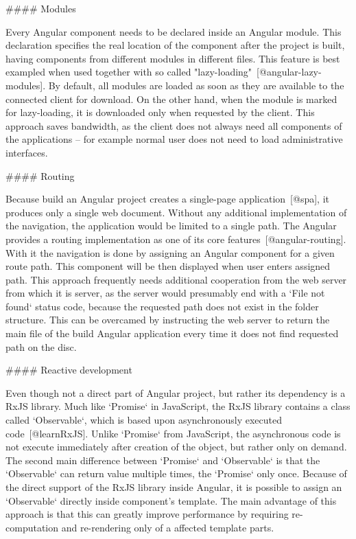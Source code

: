 \documentclass[
  digital, %
  oneside, %
  lof,     %
  lot,     %
]{fithesis4}
\begin{document}
#### Modules

Every Angular component needs to be declared inside an Angular module. This declaration specifies the real location of the component after the project is built, having components from different modules in different files. This feature is best exampled when used together with so called "lazy-loading"~[@angular-lazy-modules]. By default, all modules are loaded as soon as they are available to the connected client for download. On the other hand, when the module is marked for lazy-loading, it is downloaded only when requested by the client. This approach saves bandwidth, as the client does not always need all components of the applications -- for example normal user does not need to load administrative interfaces.


#### Routing

Because build an Angular project creates a single-page application~[@spa], it produces only a single web document. Without any additional implementation of the navigation, the application would be limited to a single path. The Angular provides a routing implementation as one of its core features~[@angular-routing]. With it the navigation is done by assigning an Angular component for a given route path. This component will be then displayed when user enters assigned path. This approach frequently needs additional cooperation from the web server from which it is server, as the server would presumably end with a `File not found` status code, because the requested path does not exist in the folder structure. This can be overcamed by instructing the web server to return the main file of the build Angular application every time it does not find requested path on the disc.


#### Reactive development

Even though not a direct part of Angular project, but rather its dependency is a RxJS library. Much like `Promise` in JavaScript, the RxJS library contains a class called `Observable`, which is based upon asynchronously executed code~[@learnRxJS]. Unlike `Promise` from JavaScript, the asynchronous code is not execute immediately after creation of the object, but rather only on demand. The second main difference between `Promise` and `Observable` is that the `Observable` can return value multiple times, the `Promise` only once. Because of the direct support of the RxJS library inside Angular, it is possible to assign an `Observable` directly inside component's template. The main advantage of this approach is that this can greatly improve performance by requiring re-computation and re-rendering only of a affected template parts.
\end{document}
